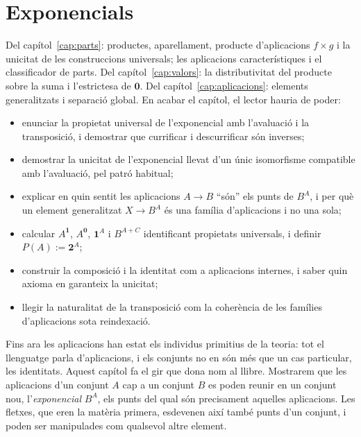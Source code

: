 \chapter{Exponencials}\label{cap:exponencials}

\begin{objectius}
 Del capítol~\ref{cap:parts}: productes, aparellament, producte d'aplicacions \(f\times g\) i la unicitat de les construccions universals; les aplicacions característiques i el classificador de parts. Del capítol~\ref{cap:valors}: la distributivitat del producte sobre la suma i l'estrictesa de \(\mathbf0\). Del capítol~\ref{cap:aplicacions}: elements generalitzats i separació global.
 En acabar el capítol, el lector hauria de poder:
\begin{itemize}
  \item enunciar la propietat universal de l'exponencial amb l'avaluació i la transposició, i demostrar que currificar i descurrificar són inverses;
  \item demostrar la unicitat de l'exponencial llevat d'un únic isomorfisme compatible amb l'avaluació, pel patró habitual;
  \item explicar en quin sentit les aplicacions \(A\to B\) \enquote{són} els punts de \(B^A\), i per què un element generalitzat \(X\to B^A\) és una família d'aplicacions i no una sola;
  \item calcular \(A^{\mathbf1}\), \(A^{\mathbf0}\), \(\mathbf1^A\) i \(B^{A+C}\) identificant propietats universals, i definir \(P(A):=\mathbf2^A\);
  \item construir la composició i la identitat com a aplicacions internes, i saber quin axioma en garanteix la unicitat;
  \item llegir la naturalitat de la transposició com la coherència de les famílies d'aplicacions sota reindexació.
\end{itemize}
\end{objectius}

Fins ara les aplicacions han estat els individus primitius de la teoria:
tot el llenguatge parla d'aplicacions, i els conjunts no en són més que un
cas particular, les identitats. Aquest capítol fa el gir que dona nom al
llibre. Mostrarem que les aplicacions d'un conjunt \(A\) cap a un conjunt
\(B\) es poden reunir en un conjunt nou, l'\emph{exponencial} \(B^A\), els
punts del qual són precisament aquelles aplicacions. Les fletxes, que eren
la matèria primera, esdevenen així també punts d'un conjunt, i poden ser
manipulades com qualsevol altre element.

